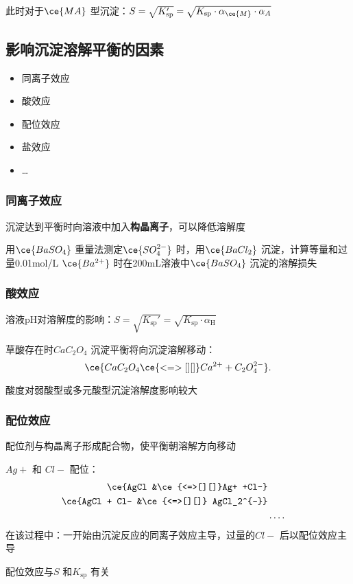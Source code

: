 此时对于$\ce{MA}$ 型沉淀：$S=\sqrt{K_\text{sp}'} =\sqrt{K_\text{sp}\cdot \alpha_{\ce{M}}\cdot \alpha_A}$
\subsection{影响沉淀溶解平衡的因素}%
\label{sub:影响沉淀溶解平衡的因素}
\begin{itemize}
    \item 同离子效应
    \item 酸效应
    \item 配位效应
    \item 盐效应
    \item \ldots 
\end{itemize}
\subsubsection*{同离子效应}%
\label{subsub:同离子效应}
\begin{defi}
    沉淀达到平衡时向溶液中加入\textbf{构晶离子}，可以降低溶解度
\end{defi}
\begin{eg}
    用$\ce{BaSO_4}$ 重量法测定$\ce{SO_4^{2-}}$ 时，用$\ce{BaCl_2}$ 沉淀，计算等量和过量0.01mol/L $\ce{Ba^{2+}}$ 时在200mL溶液中$\ce{BaSO_4}$ 沉淀的溶解损失
\end{eg}
\subsubsection*{酸效应}%
\label{subsub:酸效应}
\begin{defi}
溶液pH对溶解度的影响：$S=\sqrt{K_\text{sp}'}=\sqrt{K_\text{sp}\cdot \alpha_\text{H}}$
\end{defi}
\begin{eg}
    草酸存在时$CaC_2O_4$ 沉淀平衡将向沉淀溶解移动：\[
        \ce{CaC_2O_4 \ce{<=>[][]}Ca^{2+} +C_2O_4^{2-}}
    .\]
\end{eg}
\begin{notation}
    酸度对弱酸型或多元酸型沉淀溶解度影响较大
\end{notation}
\subsubsection*{配位效应}%
\label{subsub:配位效应}
\begin{defi}
    配位剂与构晶离子形成配合物，使平衡朝溶解方向移动
\end{defi}
\begin{eg}
    $Ag+$ 和 $Cl-$ 配位：
    \begin{align*}
        \ce{AgCl &\ce{<=>[][]}Ag+ +Cl-}\\
        \ce{AgCl + Cl- &\ce{<=>[][]} AgCl_2^{-}}\\
                       &\ldots 
    .\end{align*}
    在该过程中：一开始由沉淀反应的同离子效应主导，过量的$Cl-$ 后以配位效应主导
\end{eg}
\begin{notation}
    配位效应与$S$ 和$K_\text{sp}$ 有关
\end{notation}
